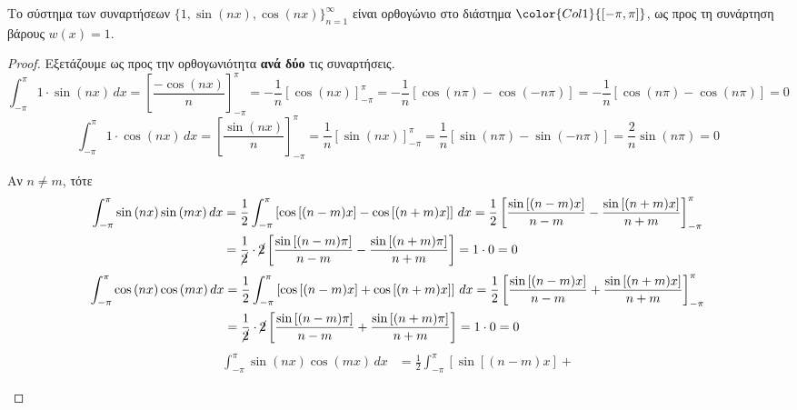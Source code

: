 \begin{prop}
  Το σύστημα των συναρτήσεων $ \{1, \sin{(nx), \cos{(nx)} } \} _{n=1}^{\infty} $ 
  είναι ορθογώνιο στο διάστημα $ \color{Col1}{[- \pi , \pi ]} $, ως προς τη 
  συνάρτηση βάρους $ w(x)=1 $.
\end{prop}
\begin{proof}
\item {}
  Εξετάζουμε ως προς την ορθογωνιότητα \textbf{ανά δύο} τις συναρτήσεις.
  \[
    \int _{- \pi}^{\pi} 1 \cdot \sin{(nx)} \,{dx} 
    =  \left[\frac{- \cos{(nx)}}{n} \right]_{- \pi}^{\pi} 
    = - \frac{1}{n} \left[\cos{(nx)} \right]_{- \pi}^{\pi} 
    = - \frac{1}{n} [\cos{(n \pi)} - \cos{(- n \pi)}] 
    = - \frac{1}{n} [\cos{(n \pi)}- \cos{(n \pi)}] = 0 
  \] 
  \[
    \int _{-\pi}^{\pi} 1 \cdot \cos{(nx)} \,{dx} 
    =  \left[\frac{\sin{(nx)}}{n} \right]_{- \pi}^{\pi} 
    = \frac{1}{n} \left[\sin{(nx)} \right]_{- \pi}^{\pi} 
    = \frac{1}{n} [ \sin{(n \pi)} - \sin{(- n \pi)}] =  \frac{2}{n} \sin{(n \pi)} = 0 
  \]
  \begin{myitemize}
    \item Αν $ n \neq m $, τότε
      \begin{align*}
        \int _{-\pi}^{\pi} \sin{(nx)} \sin{(mx)} \,{dx} 
            &=\frac{1}{2} \int_{-\pi}^{\pi} \left[\cos{[(n-m)x]} - \cos{[(n+m)x]}\right]
            \,{dx} 
            = \frac{1}{2} \left[\frac{\sin{[(n-m)x]}}{n-m} - 
            \frac{\sin{[(n+m)x]}}{n+m} \right]_{-\pi}^{\pi} \\
            &= \frac{1}{\cancel{2}} \cdot \cancel{2}  \left[{\frac{\sin{[(n-m)
                  \pi]}}{n-m}} - \frac{\sin{[(n+m)
            \pi]}}{n+m}\right] = 1 \cdot 0 = 0  
      \end{align*} 
      \begin{align*}
        \int _{-\pi}^{\pi} \cos{(nx)} \cos{(mx)} \,{dx} 
            &= \frac{1}{2} \int _{-\pi}^{\pi} \left[\cos{[(n-m)x]} + 
              \cos{[(n+m)x]} \right] \,{dx} 
              = \frac{1}{2} \left[\frac{\sin{[(n-m)x]}}{n-m} 
            + \frac{\sin{[(n+m)x]}}{n+m} \right]_{-\pi}^{\pi} \\
            &= \frac{1}{\cancel{2}} \cdot \cancel{2} \left[ 
              \frac{\sin{[(n-m) \pi]}}{n-m} + \frac{\sin{[(n+m) \pi]}}{n+m}\right] 
              = 1 \cdot 0 = 0  
      \end{align*}
      \begin{align*}
        \int _{-\pi}^{\pi} \sin{(nx)} \cos{(mx)} \,{dx} 
            &= \frac{1}{2} \int _{-\pi}^{\pi} \left[\sin{[(n-m)x]} + 

\end{align*}
\end{myitemize}
\end{proof}
